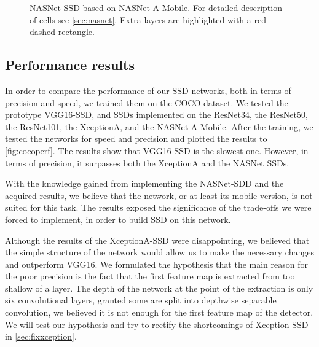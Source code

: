 

\begin{figure}
    \centering
    \nasnetSSD
    \caption[NASNet-SSD]%
    {NASNet-SSD based on NASNet-A-Mobile. For detailed description of cells see \cref{sec:nasnet}. Extra layers are highlighted with a red dashed rectangle.}
    \label{fig:nasnetSSD}
\end{figure}

\subsection{Performance results} In order to compare the performance of our SSD networks, both in terms of precision and speed, we trained them on the COCO dataset. We tested the prototype VGG16-SSD, and SSDs implemented on the ResNet34, the ResNet50, the ResNet101, the XceptionA, and the NASNet-A-Mobile. After the training, we tested the networks for speed and precision and plotted the results to \cref{fig:cocoperf}. The results show that VGG16-SSD is the slowest one. However, in terms of precision, it surpasses both the XceptionA and the NASNet SSDs.

With the knowledge gained from implementing the NASNet-SDD and the acquired results, we believe that the network, or at least its mobile version, is not suited for this task. The results exposed the significance of the trade-offs we were forced to implement, in order to build SSD on this network.

Although the results of the XceptionA-SSD were disappointing, we believed that the simple structure of the network would allow us to make the necessary changes and outperform VGG16. We formulated the hypothesis that the main reason for the poor precision is the fact that the first feature map is extracted from too shallow of a layer. The depth of the network at the point of the extraction is only six convolutional layers, granted some are split into depthwise separable convolution, we believed it is not enough for the first feature map of the detector. We will test our hypothesis and try to rectify the shortcomings of Xception-SSD in \cref{sec:fixxception}.


